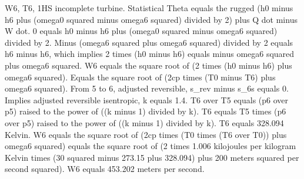 W6, T6, 1HS incomplete turbine.
Statistical Theta equals the rugged (h0 minus h6 plus (omega0 squared minus omega6 squared) divided by 2) plus Q dot minus W dot.
0 equals h0 minus h6 plus (omega0 squared minus omega6 squared) divided by 2.
Minus (omega6 squared plus omega6 squared) divided by 2 equals h6 minus h6, which implies 2 times (h0 minus h6) equals minus omega6 squared plus omega6 squared.
W6 equals the square root of (2 times (h0 minus h6) plus omega6 squared).
Equals the square root of (2cp times (T0 minus T6) plus omega6 squared).
From 5 to 6, adjusted reversible, s_rev minus s_6s equals 0.
Implies adjusted reversible isentropic, k equals 1.4.
T6 over T5 equals (p6 over p5) raised to the power of ((k minus 1) divided by k).
T6 equals T5 times (p6 over p5) raised to the power of ((k minus 1) divided by k).
T6 equals 328.094 Kelvin.
W6 equals the square root of (2cp times (T0 times (T6 over T0)) plus omega6 squared) equals the square root of (2 times 1.006 kilojoules per kilogram Kelvin times (30 squared minus 273.15 plus 328.094) plus 200 meters squared per second squared).
W6 equals 453.202 meters per second.